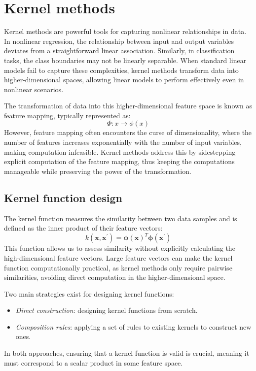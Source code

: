\section{Kernel methods}

Kernel methods are powerful tools for capturing nonlinear relationships in data. 
In nonlinear regression, the relationship between input and output variables deviates from a straightforward linear association. 
Similarly, in classification tasks, the class boundaries may not be linearly separable. 
When standard linear models fail to capture these complexities, kernel methods transform data into higher-dimensional spaces, allowing linear models to perform effectively even in nonlinear scenarios.

The transformation of data into this higher-dimensional feature space is known as feature mapping, typically represented as:
\[\Phi:x\rightarrow\phi(x)\]
However, feature mapping often encounters the curse of dimensionality, where the number of features increases exponentially with the number of input variables, making computation infeasible.
Kernel methods address this by sidestepping explicit computation of the feature mapping, thus keeping the computations manageable while preserving the power of the transformation.

\subsection{Kernel function design}
The kernel function measures the similarity between two data samples and is defined as the inner product of their feature vectors:
\[k(\mathbf{x},\mathbf{x}^\prime)=\boldsymbol{\phi}{(\mathbf{x})}^T\boldsymbol{\phi}(\mathbf{x}^\prime)\]
This function allows us to assess similarity without explicitly calculating the high-dimensional feature vectors. 
Large feature vectors can make the kernel function computationally practical, as kernel methods only require pairwise similarities, avoiding direct computation in the higher-dimensional space.

Two main strategies exist for designing kernel functions:
\begin{itemize}
    \item \textit{Direct construction}: designing kernel functions from scratch.
    \item \textit{Composition rules}: applying a set of rules to existing kernels to construct new ones.
\end{itemize}
In both approaches, ensuring that a kernel function is valid is crucial, meaning it must correspond to a scalar product in some feature space.

